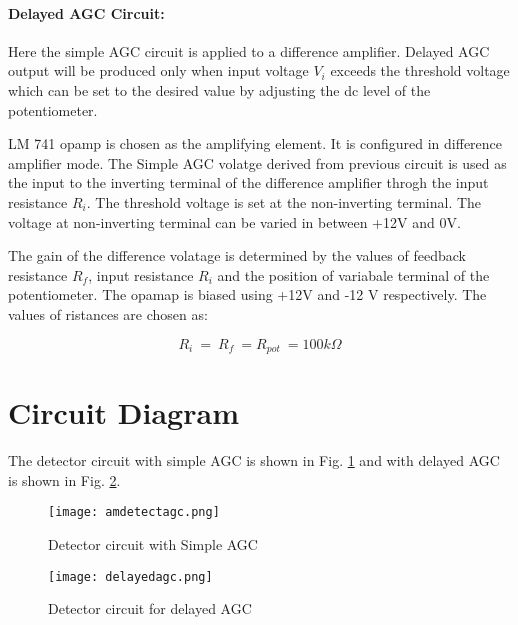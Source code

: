 \paragraph{Delayed AGC Circuit:}
Here the simple AGC circuit is applied to a difference amplifier.  Delayed AGC output will be produced only when input voltage $V_i$ exceeds the threshold voltage which can be set to the desired value by adjusting the dc level of the potentiometer.

LM 741 opamp is chosen as the amplifying element. It is configured in difference amplifier mode. The Simple AGC volatge derived from previous 
circuit is used as the input to the inverting terminal of the  difference amplifier throgh the input resistance $R_i$. The threshold voltage is set at the non-inverting terminal. The voltage at non-inverting terminal can be varied in between +12V and 0V.

The gain of the difference volatage is determined by the values of feedback resistance $R_f$, input resistance $R_i$ and the position of variabale terminal of the potentiometer. The opamap is biased using +12V and -12 V respectively. 
The values of ristances are chosen as:

\begin{equation}
R_i\ =\ R_f\ =R_{pot}\ =100 k \Omega
\end{equation}
\section*{Circuit Diagram}
The detector circuit with simple AGC is shown in Fig. \ref{detectagcckt} and with delayed AGC is shown in Fig. \ref{delayedagcckt}.
\begin{figure}

\texttt{[image: amdetectagc.png]}
\caption{Detector circuit with Simple AGC}
\label{detectagcckt}
\end{figure}

\begin{figure}

\centering \texttt{[image: delayedagc.png]}
\caption{Detector circuit for delayed AGC}
\label{delayedagcckt}
\end{figure}
